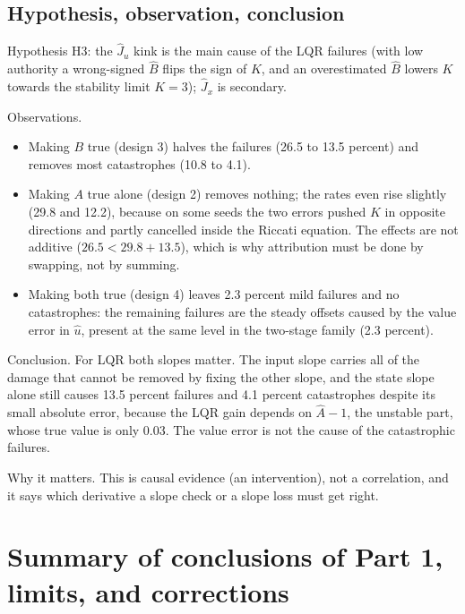 \documentclass[11pt]{article}
\begin{document}
\subsection{Hypothesis, observation, conclusion}
Hypothesis H3: the $\hat J_u$ kink is the main cause of the LQR failures (with low authority a wrong-signed $\hat B$ flips the sign of $K$, and an overestimated $\hat B$ lowers $K$ towards the stability limit $K=3$); $\hat J_x$ is secondary.

Observations.
\begin{itemize}
\item Making $B$ true (design 3) halves the failures (26.5 to 13.5 percent) and removes most catastrophes (10.8 to 4.1).
\item Making $A$ true alone (design 2) removes nothing; the rates even rise slightly (29.8 and 12.2), because on some seeds the two errors pushed $K$ in opposite directions and partly cancelled inside the Riccati equation. The effects are not additive ($26.5<29.8+13.5$), which is why attribution must be done by swapping, not by summing.
\item Making both true (design 4) leaves 2.3 percent mild failures and no catastrophes: the remaining failures are the steady offsets caused by the value error in $\hat u$, present at the same level in the two-stage family (2.3 percent).
\end{itemize}
Conclusion. For LQR both slopes matter. The input slope carries all of the damage that cannot be removed by fixing the other slope, and the state slope alone still causes 13.5 percent failures and 4.1 percent catastrophes despite its small absolute error, because the LQR gain depends on $\hat A-1$, the unstable part, whose true value is only 0.03. The value error is not the cause of the catastrophic failures.

Why it matters. This is causal evidence (an intervention), not a correlation, and it says which derivative a slope check or a slope loss must get right.

\section{Summary of conclusions of Part 1, limits, and corrections}\label{sec:summary}
\end{document}
